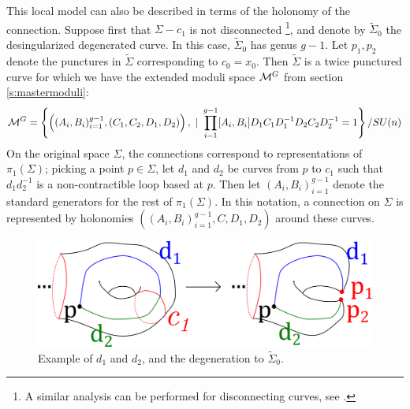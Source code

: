 	This local model can also be described in terms of the holonomy of the connection. Suppose first that $\Sigma - c_1$ is not disconnected \footnote{A similar analysis can be performed for disconnecting curves, see \cite[Page 10]{biswas_degenerations_2021}.}, and denote by $\tilde{\Sigma}_0$ the desingularized degenerated curve. In this case, $\tilde{\Sigma}_0$ has genus $g-1$. Let $p_1, p_2$ denote the punctures in $\tilde{\Sigma}$ corresponding to $c_0 = x_0$. Then $\tilde{\Sigma}$ is a twice punctured curve for which we have the extended moduli space $\mathcal{M}^G$ from section \ref{s:mastermoduli}:
	\begin{equation}
		\mathcal{M}^G = \left\{\left((A_i,B_i)_{i=1}^{g-1}, (C_1,C_2,D_1,D_2)\right), ~|~ \prod_{i=1}^{g-1}[A_i,B_i]D_1C_1D_1^{-1}D_2C_2D_2^{-1} = 1\right\} / SU(n)
	\end{equation}
	On the original space $\Sigma$, the connections correspond to representations of $\pi_1(\Sigma)$; picking a point $p\in\Sigma$, let $d_1$ and $d_2$ be curves from $p$ to $c_1$ such that $d_1d^{-1}_2$ is a non-contractible loop based at $p$. Then let $(A_i,B_i)_{i=1}^{g-1}$ denote the standard generators for the rest of $\pi_1(\Sigma)$. In this notation, a connection on $\Sigma$ is represented by holonomies $\left((A_i,B_i)_{i=1}^{g-1}, C,D_1,D_2\right)$ around these curves.
	
	\begin{figure}
		\centering
		\includegraphics[width=0.8\linewidth]{d1d2_degen.png}
		\caption{Example of $d_1$ and $d_2$, and the degeneration to $\tilde{\Sigma}_0$.}
	\end{figure}
	
